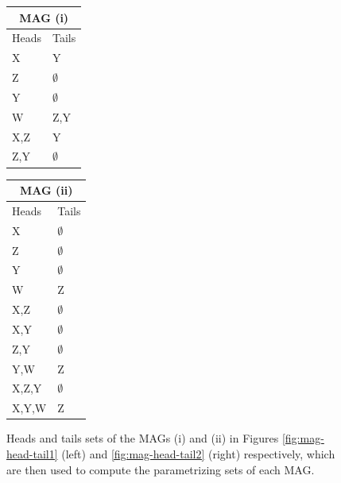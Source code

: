 \documentclass[a4paper]{article}
\begin{document}
\begin{figure}
	\centering
	\begin{minipage}{0.45\textwidth}
		\centering
		\begin{tabular}{ |p{1cm}|p{1cm}|  }
			\hline
			\multicolumn{2}{|c|}{MAG (i)} \\
			\hline
			Heads & Tails\\
			\hline
			X & Y \\
			Z & $\emptyset$ \\
			Y & $\emptyset$ \\
			W & Z,Y \\ 
			X,Z & Y \\
			Z,Y & $\emptyset$ \\
			\hline
		\end{tabular}
	\end{minipage}
	\begin{minipage}{0.45\textwidth}
		\centering
		\begin{tabular}{ |p{1cm}|p{1cm}|  }
			\hline
			\multicolumn{2}{|c|}{MAG (ii)} \\
			\hline
			Heads & Tails\\
			\hline
			X & $\emptyset$ \\
			Z & $\emptyset$ \\
			Y & $\emptyset$ \\
			W & Z \\ 
			X,Z & $\emptyset$ \\
			X,Y & $\emptyset$ \\
			Z,Y & $\emptyset$ \\
			Y,W & Z \\
			X,Z,Y & $\emptyset$ \\
			X,Y,W & Z \\
			\hline
		\end{tabular}
	\end{minipage}
   \label{fig:mag-head-tail3}
	\caption{Heads and tails sets of the MAGs (i) and (ii) in Figures \ref{fig:mag-head-tail1} (left) and \ref{fig:mag-head-tail2} (right) respectively, which are then used to compute the parametrizing sets of each MAG.}
\end{figure}
\end{document}
